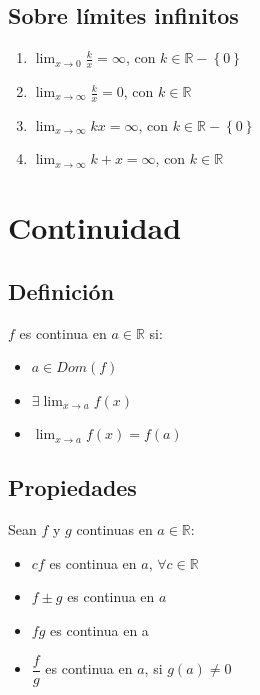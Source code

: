 \documentclass[11pt,titlepage]{article}
\newcommand{\commLim}[2]{\lim_{#1 \to #2}}
\newcommand{\displayLim}[2]{\displaystyle \commLim{#1}{#2}}
\begin{document}
\subsection{Sobre límites infinitos}
\begin{multicols}{2}
	\begin{enumerate}[label=\alph*.]
		\item $ \displayLim{x}{0} \frac{k}{x} = \infty$, \quad con $ k \in \mathbb{R} - \left\{0 \right\} $
		\item $ \displayLim{x}{\infty} \frac{k}{x} = 0$, \quad con $ k \in \mathbb{R} $
		\item $ \displayLim{x}{\infty} kx = \infty$, \quad con $k \in \mathbb{R} - \left\{0\right\} $
		\item $ \displayLim{x}{\infty} k + x = \infty$, \quad con $ k \in \mathbb{R} $
	\end{enumerate}
\end{multicols}


\vspace{1cm}
\section{Continuidad}
\subsection{Definición}
$f$ es continua en $a \in \mathbb{R}$ si:
\begin{itemize}
	\item $a \in Dom(f)$
	\item $\exists \commLim{x}{a} f(x)$
	\item $\commLim{x}{a} f(x) = f(a)$
\end{itemize}

\subsection{Propiedades}
Sean $f$ y $g$ continuas en $a \in \mathbb{R}$:
\begin{multicols}{2}
	\begin{itemize}
		\item $cf$ es continua en $a$, $\forall c \in \mathbb{R}$
		\item $f \pm g$ es continua en $a$
		\item $fg$ es continua en a
		\item $\dfrac{f}{g}$ es continua en $a$, si $g(a) \neq 0$
	\end{itemize}
\end{multicols}
	
\end{document}
